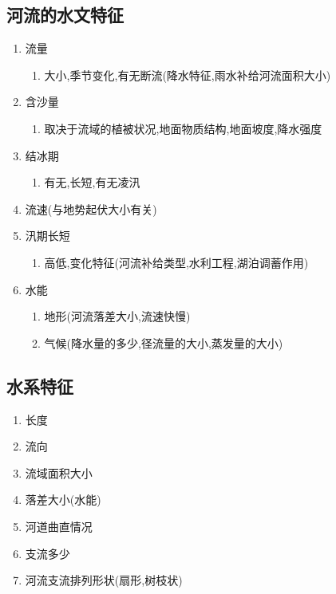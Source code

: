 \documentclass[a4paper]{article}
\begin{document}
    \subsection{河流的水文特征}
    \begin{enumerate}
        \item 流量
        \begin{enumerate}
            \item 大小,季节变化,有无断流(降水特征,雨水补给河流面积大小)
        \end{enumerate}
        \item 含沙量
        \begin{enumerate}
            \item 取决于流域的植被状况,地面物质结构,地面坡度,降水强度
        \end{enumerate}
        \item 结冰期
        \begin{enumerate}
            \item 有无,长短,有无凌汛
        \end{enumerate}
        \item 流速(与地势起伏大小有关)
        \item 汛期长短
        \begin{enumerate}
            \item 高低,变化特征(河流补给类型,水利工程,湖泊调蓄作用)
        \end{enumerate}
        \item 水能
        \begin{enumerate}
            \item 地形(河流落差大小,流速快慢)
            \item 气候(降水量的多少,径流量的大小,蒸发量的大小)
        \end{enumerate}
    \end{enumerate}
    \subsection{水系特征}
    \begin{enumerate}
        \item 长度
        \item 流向
        \item 流域面积大小
        \item 落差大小(水能)
        \item 河道曲直情况
        \item 支流多少
        \item 河流支流排列形状(扇形,树枝状)
    \end{enumerate}
\end{document}
